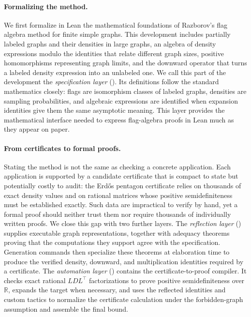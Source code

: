 \documentclass{article}
\begin{document}
\paragraph{Formalizing the method.}
We first formalize in Lean the mathematical foundations of Razborov's flag
algebra method for finite simple graphs.  This development includes partially
labeled graphs and their densities in large graphs, an algebra of density
expressions modulo the identities that relate different graph sizes, positive
homomorphisms representing graph limits, and the downward operator that turns
a labeled density expression into an unlabeled one.  We call this part of the
development the \emph{specification layer} ().  Its
definitions follow the standard mathematics closely: flags are isomorphism
classes of labeled graphs, densities are sampling probabilities, and algebraic
expressions are identified when expansion identities give them the same
asymptotic meaning.  This layer provides the mathematical interface needed to
express flag-algebra proofs in Lean much as they appear on paper.

\paragraph{From certificates to formal proofs.}
Stating the method is not the same as checking a concrete application.  Each
application is supported by a candidate certificate that is compact to state
but potentially costly to audit: the Erd\H{o}s pentagon certificate relies
on thousands of exact density values and on rational matrices whose
positive semidefiniteness must be established exactly.  Such data are
impractical to verify by hand, yet a formal proof should neither trust them nor
require thousands of individually written proofs.  We close this gap with two
further layers.  The
\emph{reflection layer} () supplies executable graph
representations, together with adequacy theorems proving that the computations
they support agree with the specification.  Generation commands then
specialize these theorems at elaboration time to produce the verified density,
downward, and multiplication identities required by a certificate.  The
\emph{automation layer} () contains the
certificate-to-proof compiler.  It checks exact rational $LDL^\top$
factorizations to prove positive semidefiniteness over $\mathbb{R}$, expands
the target when necessary, and uses the reflected identities and custom
tactics to normalize the certificate calculation under the forbidden-graph
assumption and assemble the final bound.
\end{document}
